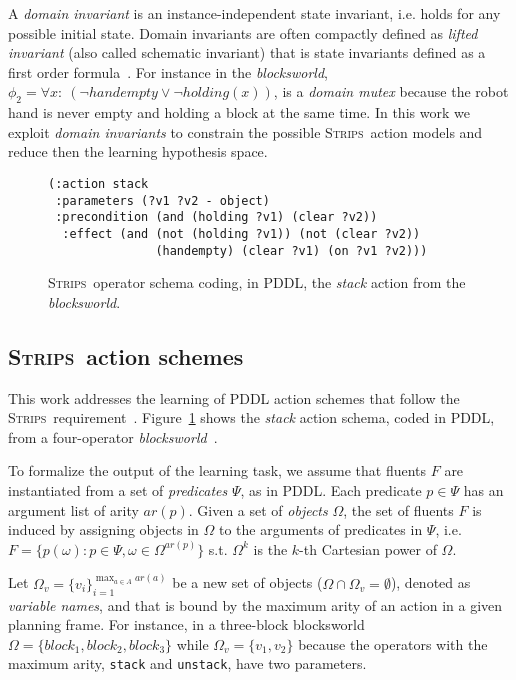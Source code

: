 \documentclass{article}
\newcommand{\strips}{\textsc{Strips}}     %
\begin{document}
A {\em domain invariant} is an instance-independent state invariant, i.e. holds for any possible initial state. Domain invariants are often compactly defined as {\em lifted invariant} (also called schematic invariant) that is state invariants defined as a first order formula~\cite{rintanen:schematicInvariants:AAAI2017}. For instance in the {\em blocksworld}, $\phi_2=\forall x:\ (\neg handempty\vee \neg holding(x))$, is a {\em domain mutex} because the robot hand is never empty and holding a block at the same time. In this work we exploit {\em domain invariants} to constrain the possible \strips\ action models and reduce then the learning hypothesis space.

\begin{figure}
\begin{scriptsize}
\begin{verbatim}
(:action stack
 :parameters (?v1 ?v2 - object)
 :precondition (and (holding ?v1) (clear ?v2))
  :effect (and (not (holding ?v1)) (not (clear ?v2))
               (handempty) (clear ?v1) (on ?v1 ?v2)))
\end{verbatim}
\end{scriptsize}
 \caption{\small \strips\ operator schema coding, in PDDL, the {\em stack} action from the {\em blocksworld}.}
\label{fig:stack}
\end{figure}

\subsection{\strips\ action schemes}
This work addresses the learning of PDDL action schemes that follow the \strips\ requirement~\cite{mcdermott1998pddl,fox2003pddl2}. Figure~\ref{fig:stack} shows the {\em stack} action schema, coded in PDDL, from a four-operator {\em blocksworld}~\cite{slaney2001blocks}.

To formalize the output of the learning task, we assume that fluents $F$ are instantiated from a set of {\em predicates} $\Psi$, as in PDDL. Each predicate $p\in\Psi$ has an argument list of arity $ar(p)$. Given a set of {\em objects} $\Omega$, the set of fluents $F$ is induced by assigning objects in $\Omega$ to the arguments of predicates in $\Psi$, i.e.~$F=\{p(\omega):p\in\Psi,\omega\in\Omega^{ar(p)}\}$ s.t. $\Omega^k$ is the $k$-th Cartesian power of $\Omega$.

Let $\Omega_v=\{v_i\}_{i=1}^{\operatorname*{max}_{a\in A} ar(a)}$ be a new set of objects ($\Omega\cap\Omega_v=\emptyset$), denoted as {\em variable names}, and that is bound by the maximum arity of an action in a given planning frame. For instance, in a three-block blocksworld $\Omega=\{block_1, block_2, block_3\}$ while $\Omega_v=\{v_1, v_2\}$ because the operators with the maximum arity, {\small\tt stack} and {\small\tt unstack}, have two parameters.
\end{document}
